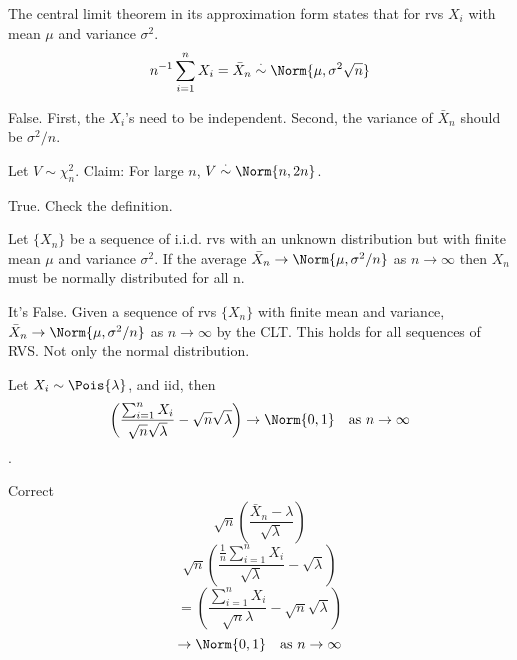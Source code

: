 \documentclass[tf-tutorial-all.tex]{subfiles}
\begin{document}
\begin{truefalse}
  The central limit theorem in its approximation form states that for
  rvs $X_i$ with mean $\mu$ and variance $\sigma^2$.
  $$ n^{-1}\sum_{i=1}^n X_i = \bar X_n \stackrel{\cdot}\sim \Norm{\mu, \sigma^2 \sqrt{n}} $$
\begin{solution}
False. First, the $X_i$'s need to be independent. Second, the variance of $\bar X_{n}$ should  be $\sigma^2/n$.
\end{solution}
\end{truefalse}

\begin{truefalse}
  Let $V \sim \chi^2_n$. Claim: For large $n$, $V \stackrel{\cdot}\sim \Norm{n, 2n}$.
\begin{solution}
True. Check the definition.
\end{solution}
\end{truefalse}

\begin{truefalse}
Let $\{X_{n}\}$ be a sequence of i.i.d. rvs with an unknown distribution but with finite mean $\mu $ and variance $\sigma^{2}$.
If the average $\bar{X}_{n} \to \Norm{\mu, \sigma^{2}/n}$ as $n \to \infty$ then $  X_{n}$ must be normally distributed for all n. 
\begin{solution}
It's False. Given a sequence of rvs $\{X_{n}\}$ with finite mean and variance,  $\bar{X}_{n} \to \Norm{\mu, \sigma^{2}/n}$ as $n \to \infty$ by the CLT.
This holds for all sequences of RVS. Not only the normal distribution. 

\end{solution}
\end{truefalse}


\begin{truefalse}
Let $X_{i} \sim \Pois{\lambda}$, and iid, then $$\left( \frac{ \sum^{n}_{i=1} X_{i}}{\sqrt{n} \sqrt{\lambda}} - \sqrt{n}\sqrt{\lambda} \right) \to \Norm{0,1} \quad \text{as } n \to \infty$$.
\begin{solution}
Correct\\
$$\sqrt{n} \left( \frac{ \bar{X}_{n}  - \lambda}{\sqrt{\lambda}}  \right) $$
$$\sqrt{n} \left( \frac{ \frac{1}{n} \sum^{n}_{i=1} X_{i}  }{\sqrt{\lambda}} - \sqrt{\lambda}  \right) $$
$$ = \left( \frac{ \sum^{n}_{i=1} X_{i}}{\sqrt{n}\lambda} - \sqrt{n}\sqrt{\lambda} \right)$$
$$
\to \Norm{0,1} \quad \text{as } n \to \infty$$
\end{solution}
\end{truefalse}
\end{document}
